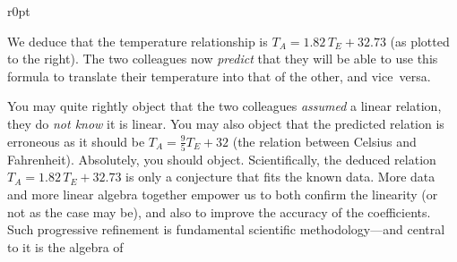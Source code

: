 \begin{example}
\begin{wrapfigure}[8]r{0pt}
\end{wrapfigure}
We deduce that the temperature relationship is \(T_A=1.82\,T_E+32.73\) (as plotted to the right).
The two colleagues now \emph{predict} that they will be able to use this formula to translate their temperature into that of the other, and vice~versa.

You may quite rightly object that the two colleagues \emph{assumed} a linear relation, they do \emph{not know} it is linear.
You may also object that the predicted relation is erroneous as it should be \(T_A=\frac95T_E+32\) (the relation between Celsius and Fahrenheit).
Absolutely, you should object.
Scientifically, the deduced relation  \(T_A=1.82\,T_E+32.73\) is only a conjecture that fits the known data.
More data and more linear algebra together empower us to both confirm the linearity (or not as the case may be), and also to improve the accuracy of the coefficients. 
Such progressive refinement is fundamental scientific methodology---and central to it is the algebra of 
\end{example}


